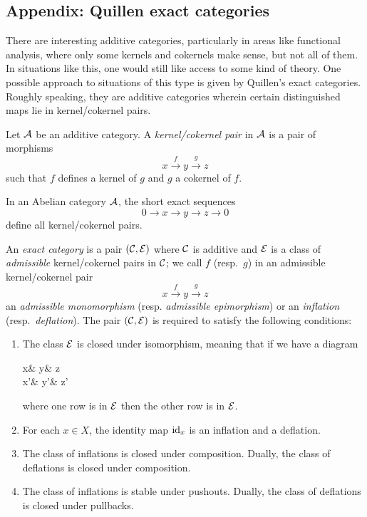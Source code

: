 \subsection{Appendix: Quillen exact categories}\label{appendix:quillen-exact-categories}
There are interesting additive categories, particularly in areas like functional analysis, where only some kernels and cokernels make sense, but not all of them. In
situations like this, one would still like access to some kind of theory. One possible approach to situations of this type is given by Quillen's exact categories. Roughly speaking,
they are additive categories wherein certain distinguished maps lie in kernel/cokernel pairs.
\begin{definition}
	Let \(\mathcal{A}\) be an additive category. A \emph{kernel/cokernel pair} in \(\mathcal{A}\) is a pair of morphisms
	\[ x\overset{f}\to y\overset{g}\to z \]
	such that \(f\) defines a kernel of \(g\) and \(g\) a cokernel of \(f\).
\end{definition}
\begin{example}
	In an Abelian category \(\mathcal{A}\), the short exact sequences
	\[ 0\to x\to y \to z \to 0 \]
	define all kernel/cokernel pairs.
\end{example}
\begin{definition}
	An \emph{exact category} is a pair \((\mathcal{C},\mathcal{E})\) where \(\mathcal{C}\) is additive and \(\mathcal{E}\) is a class of \emph{admissible} kernel/cokernel pairs in \(\mathcal{C}\); we
	call \(f\) (resp.\ \(g\)) in an admissible kernel/cokernel pair
	\[ x\overset{f}\to y\overset{g}\to z \]
	an \emph{admissible monomorphism} (resp. \emph{admissible epimorphism}) or an \emph{inflation} (resp.\ \emph{deflation}). The pair \((\mathcal{C},\mathcal{E})\) is required
	to satisfy the following conditions:
	\begin{enumerate}[label=(\arabic*)]
	\item The class \(\mathcal{E}\) is closed under isomorphism, meaning that if we have a diagram
	\begin{diagram*}
		x\ar[r] & y\ar[r] & z \\
		x'\ar[r] & y'\ar[r] & z'
	\end{diagram*}
	where one row is in \(\mathcal{E}\) then the other row is in \(\mathcal{E}\).
	\item For each \(x\in X\), the identity map \(\mathrm{id}_x\) is an inflation and a deflation.
	\item The class of inflations is closed under composition. Dually, the class of deflations is closed under composition.
	\item The class of inflations is stable under pushouts. Dually, the class of deflations is closed under pullbacks.
	\end{enumerate}
\end{definition}
